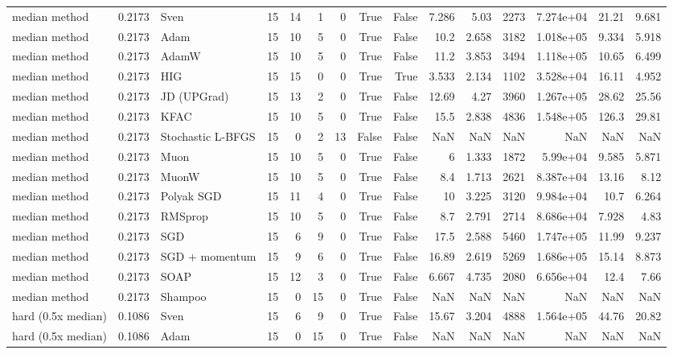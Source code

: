 \begin{tabular}{lrlrrrrrrrrrrrr}
median method & 0.2173 & Sven & 15 & 14 & 1 & 0 & True & False & 7.286 & 5.03 & 2273 & 7.274e+04 & 21.21 & 9.681 \\
median method & 0.2173 & Adam & 15 & 10 & 5 & 0 & True & False & 10.2 & 2.658 & 3182 & 1.018e+05 & 9.334 & 5.918 \\
median method & 0.2173 & AdamW & 15 & 10 & 5 & 0 & True & False & 11.2 & 3.853 & 3494 & 1.118e+05 & 10.65 & 6.499 \\
median method & 0.2173 & HIG & 15 & 15 & 0 & 0 & True & True & 3.533 & 2.134 & 1102 & 3.528e+04 & 16.11 & 4.952 \\
median method & 0.2173 & JD (UPGrad) & 15 & 13 & 2 & 0 & True & False & 12.69 & 4.27 & 3960 & 1.267e+05 & 28.62 & 25.56 \\
median method & 0.2173 & KFAC & 15 & 10 & 5 & 0 & True & False & 15.5 & 2.838 & 4836 & 1.548e+05 & 126.3 & 29.81 \\
median method & 0.2173 & Stochastic L-BFGS & 15 & 0 & 2 & 13 & False & False & NaN & NaN & NaN & NaN & NaN & NaN \\
median method & 0.2173 & Muon & 15 & 10 & 5 & 0 & True & False & 6 & 1.333 & 1872 & 5.99e+04 & 9.585 & 5.871 \\
median method & 0.2173 & MuonW & 15 & 10 & 5 & 0 & True & False & 8.4 & 1.713 & 2621 & 8.387e+04 & 13.16 & 8.12 \\
median method & 0.2173 & Polyak SGD & 15 & 11 & 4 & 0 & True & False & 10 & 3.225 & 3120 & 9.984e+04 & 10.7 & 6.264 \\
median method & 0.2173 & RMSprop & 15 & 10 & 5 & 0 & True & False & 8.7 & 2.791 & 2714 & 8.686e+04 & 7.928 & 4.83 \\
median method & 0.2173 & SGD & 15 & 6 & 9 & 0 & True & False & 17.5 & 2.588 & 5460 & 1.747e+05 & 11.99 & 9.237 \\
median method & 0.2173 & SGD + momentum & 15 & 9 & 6 & 0 & True & False & 16.89 & 2.619 & 5269 & 1.686e+05 & 15.14 & 8.873 \\
median method & 0.2173 & SOAP & 15 & 12 & 3 & 0 & True & False & 6.667 & 4.735 & 2080 & 6.656e+04 & 12.4 & 7.66 \\
median method & 0.2173 & Shampoo & 15 & 0 & 15 & 0 & True & False & NaN & NaN & NaN & NaN & NaN & NaN \\
hard (0.5x median) & 0.1086 & Sven & 15 & 6 & 9 & 0 & True & False & 15.67 & 3.204 & 4888 & 1.564e+05 & 44.76 & 20.82 \\
hard (0.5x median) & 0.1086 & Adam & 15 & 0 & 15 & 0 & True & False & NaN & NaN & NaN & NaN & NaN & NaN \\

\end{tabular}
